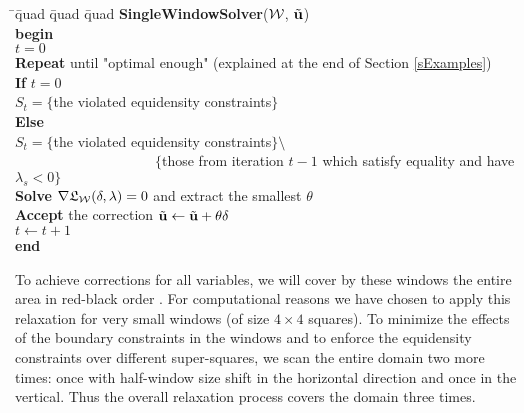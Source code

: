 \documentclass[final]{siamltex}
\newcommand{\keyw}[1]{{\bf #1}}
\begin{document}
\begin{tabbing}
  \quad \=\quad \=quad \=quad \=quad         \kill
  {\bf SingleWindowSolver}($\mathcal{W}$, $\tilde{{\bf u}}$)\\
  \keyw{begin}\\
  \> $t=0$ \\
  \> \keyw{Repeat} until "optimal enough" (explained at the end of Section \ref{sExamples})\\
  \>\> \keyw{If} $t=0$\\
  \>\>\>$S_t=\{$the violated equidensity constraints$\}$\\
  \>\> \keyw{Else}\\
  \>\>\>$S_t=\{$the violated equidensity constraints$\} \setminus $\\
            ~~~~~~~~~~~~~~~~~~~~$\{$those from iteration $t-1$ which satisfy equality and have $\lambda_s<0\}$\\
  \>\> \keyw{Solve} $\nabla \mathfrak{L}_{\mathcal{W}}(\delta,\lambda)=0$ and extract the smallest $\theta$\\
  \>\> \keyw{Accept} the correction $\tilde{{\bf u}}\leftarrow\tilde{{\bf u}} +\theta \delta$\\
  \>\> $t\leftarrow t+1$\\\keyw{end}\\
\end{tabbing}
\par To achieve corrections for all variables, we will cover by these windows the
entire area in red-black order \cite{mgbooktrott}. For
computational reasons we have chosen to apply this relaxation for
very small windows (of size $4\times 4$ squares). To minimize the
effects of the boundary constraints in the windows and to enforce
the equidensity constraints over different super-squares, we scan the
entire domain two more times: once with
half-window size shift in the horizontal direction and once in the
vertical. Thus the overall relaxation process covers the domain
three times.
\end{document}
